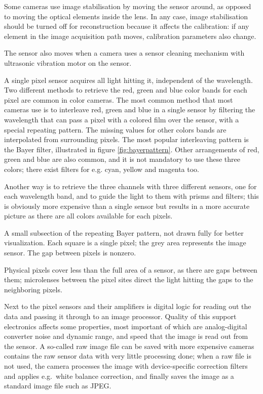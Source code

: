 
Some cameras use image stabilisation by moving the sensor around, as opposed to moving the optical elements inside the lens.
In any case, image stabilisation should be turned off for reconstruction because it affects the calibration: if any element in the image acquisition path moves, calibration parameters also change.

The sensor also moves when a camera uses a sensor cleaning mechanism with ultrasonic vibration motor on the sensor.


A single pixel sensor acquires all light hitting it, independent of the wavelength.
Two different methods to retrieve the red, green and blue color bands for each pixel are common in color cameras.
The most common method that most cameras use is to interleave red, green and blue in a single sensor by filtering the wavelength that can pass a pixel with a colored film over the sensor, with a special repeating pattern.
The missing values for other colors bands are interpolated from surrounding pixels.
The most popular interleaving pattern is the Bayer filter, illustrated in figure \ref{fig:bayerpattern}.
Other arrangements of red, green and blue are also common, and it is not mandatory to use these three colors; there exist filters for e.g. cyan, yellow and magenta too.

Another way is to retrieve the three channels with three different sensors, one for each wavelength band, and to guide the light to them with prisms and filters; this is obviously more expensive than a single sensor but results in a more accurate picture as there are all colors available for each pixels.

{A small subsection of the repeating Bayer pattern, not drawn fully for better visualization. Each square is a single pixel; the grey area represents the image sensor. The gap between pixels is nonzero.}


Physical pixels cover less than the full area of a sensor, as there are gaps between them;
microlenses between the pixel sites direct the light hitting the gaps to the neighboring pixels.


Next to the pixel sensors and their amplifiers is digital logic for reading out the data and passing it through to an image processor.
Quality of this support electronics affects some properties, most important of which are analog-digital converter noise and dynamic range, and speed that the image is read out from the sensor.
A so-called raw image file can be saved with more expensive cameras contains the raw sensor data with very little processing done;
when a raw file is not used, the camera processes the image with device-specific correction filters and applies e.g.~white balance correction, and finally saves the image as a standard image file such as JPEG.


